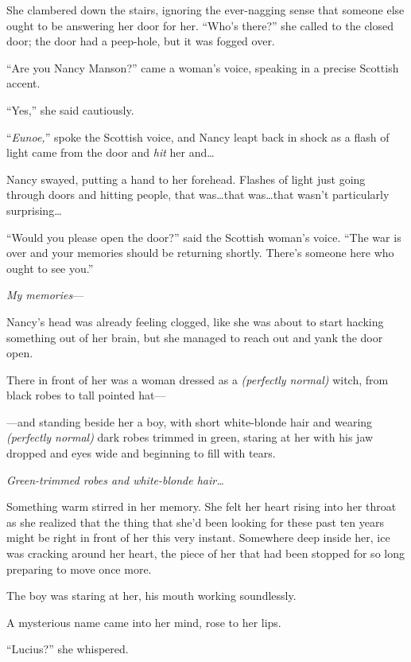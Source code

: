 She clambered down the stairs, ignoring the ever-nagging sense that someone else ought to be answering her door for her. “Who’s there?” she called to the closed door; the door had a peep-hole, but it was fogged over.

“Are you Nancy Manson?” came a woman’s voice, speaking in a precise Scottish accent.

“Yes,” she said cautiously.

“\emph{Eunoe,}” spoke the Scottish voice, and Nancy leapt back in shock as a flash of light came from the door and \emph{hit} her and…

Nancy swayed, putting a hand to her forehead. Flashes of light just going through doors and hitting people, that was…that was…that wasn’t particularly surprising…

“Would you please open the door?” said the Scottish woman’s voice. “The war is over and your memories should be returning shortly. There’s someone here who ought to see you.”

\emph{My memories}—

Nancy’s head was already feeling clogged, like she was about to start hacking something out of her brain, but she managed to reach out and yank the door open.

There in front of her was a woman dressed as a \emph{(perfectly normal)} witch, from black robes to tall pointed hat—

—and standing beside her a boy, with short white-blonde hair and wearing \emph{(perfectly normal)} dark robes trimmed in green, staring at her with his jaw dropped and eyes wide and beginning to fill with tears.

\emph{Green-trimmed robes and white-blonde hair…}

Something warm stirred in her memory. She felt her heart rising into her throat as she realized that the thing that she’d been looking for these past ten years might be right in front of her this very instant. Somewhere deep inside her, ice was cracking around her heart, the piece of her that had been stopped for so long preparing to move once more.

The boy was staring at her, his mouth working soundlessly.

A mysterious name came into her mind, rose to her lips.

“Lucius?” she whispered.

